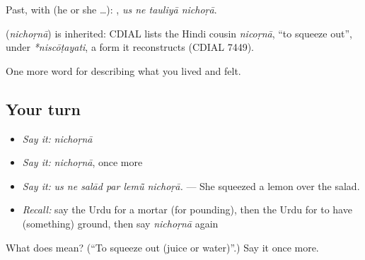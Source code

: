 Past, with  (he or she …):    , \emph{us ne tauliyā nichoṛā}.

\begin{cousinweb}
\textbf{} (\emph{nichoṛnā}) is inherited: CDIAL lists the Hindi cousin \emph{nicoṛnā}, \textquotedblleft{}to squeeze out\textquotedblright{}, under \emph{*niscōṭayati}, a form it reconstructs (CDIAL 7449).
\end{cousinweb}

\begin{grammarlens}[title={What you've built}]
One more word for describing what you lived and felt.
\end{grammarlens}

\subsection*{Your turn}
\begin{itemize}
\raggedright
  \item \emph{Say it:} \emph{nichoṛnā}
  \item \emph{Say it:} \emph{nichoṛnā}, once more
  \item \emph{Say it:} \emph{us ne salād par lemū̃ nichoṛā.} — She squeezed a lemon over the salad.
  \item \emph{Recall:} say the Urdu for a mortar (for pounding), then the Urdu for to have (something) ground, then say \emph{nichoṛnā} again
\end{itemize}

\begin{tcolorbox}[breakable,colback=teal!4,colframe=teal!35!black,title={Before you move on}]
What does  mean? (\textquotedblleft{}To squeeze out (juice or water)\textquotedblright{}.) Say it once more.
\end{tcolorbox}

